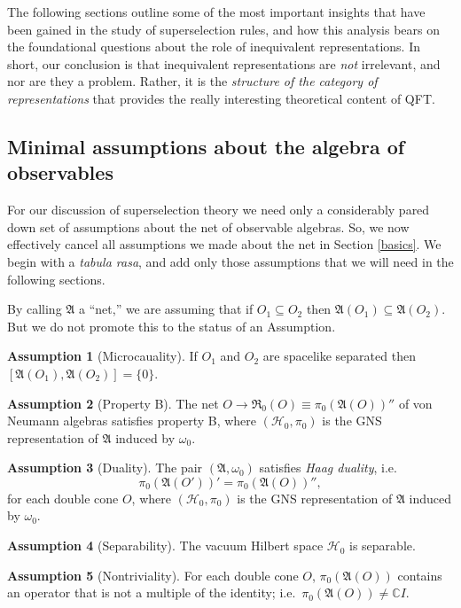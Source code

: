\documentclass[12pt]{article}
\newenvironment{bxd}%
  {\bigskip\noindent\begin{Sbox}\begin{minipage}{0.9\textwidth} }%
  {\end{minipage}\end{Sbox}\fbox{\TheSbox}\bigskip}%
\newcommand{\alg}[1]{\mathfrak{#1}}
\theoremstyle{definition}
\newtheorem{assumption}{Assumption}
\theoremstyle{definition}
\theoremstyle{remark}
\def\2#1{{\mathcal #1}}
\def\7#1{{\mathbb #1}}
\def\al#1{{\mathfrak #1}}
\def\om{\omega} \def\Om{\Omega} \def\dd{\partial} \def\D{\Delta}
\begin{document}
The following sections outline some of the most important insights
that have been gained in the study of superselection rules, and how
this analysis bears on the foundational questions about the role of
inequivalent representations.  In short, our conclusion is that
inequivalent representations are \emph{not} irrelevant, and nor are
they a problem.  Rather, it is the \emph{structure of the category of
  representations} that provides the really interesting theoretical
content of QFT.

\subsection{Minimal assumptions about the algebra of observables} \label{proto-DHR}

For our discussion of superselection theory we need only a
considerably pared down set of assumptions about the net of observable
algebras.  So, we now effectively cancel all assumptions we made about
the net in Section \ref{basics}.  We begin with a \emph{tabula rasa},
and add only those assumptions that we will need in the following
sections.

\setcounter{assumption}{0} 

By calling $\al A$ a ``net,'' we are assuming that if $O_1\subseteq
O_2$ then $\al A(O_1)\subseteq \al A(O_2)$.  But we do not promote
this to the status of an Assumption.

\begin{bxd}
\begin{assumption}[Microcauality] If $O_1$ and $O_2$ are spacelike
  separated then $[\alg{A}(O_1),\alg{A}(O_2)]=\{ 0\}$.
\end{assumption}
\begin{assumption}[Property B] The net $O\to \alg{R}_0(O)\equiv \pi
  _0(\alg{A}(O))''$ of von Neumann algebras satisfies property B,
  where $(\2H _0,\pi _0)$ is the GNS representation of $\alg{A}$
  induced by $\om _0$.
  \label{borchers}
\end{assumption}
\begin{assumption}[Duality] The pair $(\alg{A},\om _0)$ satisfies
  \emph{Haag duality}, i.e.\
  $$ \pi _0(\alg{A}(O'))'=\pi _0(\alg{A}(O))'' ,$$ for each double cone $O$, where
  $(\2H _0 ,\pi _0)$ is the GNS representation of $\alg{A}$ induced by
  $\omega _0$.
\end{assumption}
\begin{assumption}[Separability] The vacuum Hilbert space $\2H _0$ is
  separable.  \end{assumption}
\begin{assumption}[Nontriviality] For each double cone $O$, $\pi
  _0(\alg{A}(O))$ contains an operator that is not a multiple of the
  identity; i.e.\ $\pi _0(\alg{A}(O))\neq \7C I$.
  \label{nontrivial}
\end{assumption} \end{bxd}
\end{document}
